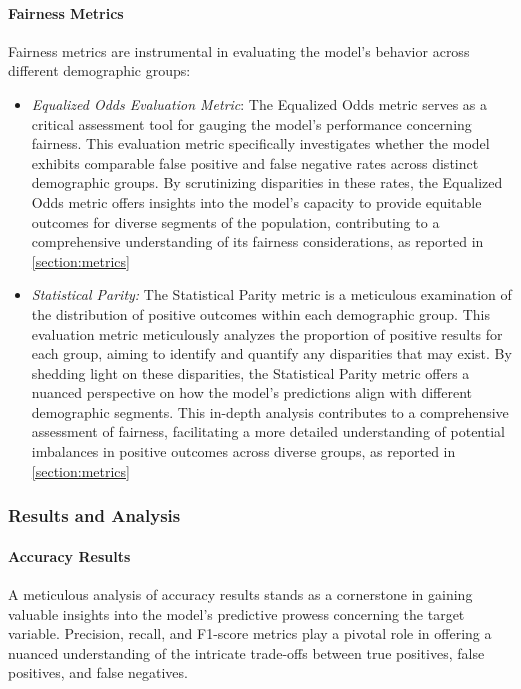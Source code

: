 \paragraph{Fairness Metrics}

Fairness metrics are instrumental in evaluating the model's behavior across different demographic groups:

\begin{itemize}
    
    \item \emph{Equalized Odds Evaluation Metric}: The Equalized Odds metric serves as a critical assessment tool for gauging the model's performance concerning fairness. This evaluation metric specifically investigates whether the model exhibits comparable false positive and false negative rates across distinct demographic groups. By scrutinizing disparities in these rates, the Equalized Odds metric offers insights into the model's capacity to provide equitable outcomes for diverse segments of the population, contributing to a comprehensive understanding of its fairness considerations, as reported in \cref{section:metrics}
    
    \item \emph{Statistical Parity:} The Statistical Parity metric is a meticulous examination of the distribution of positive outcomes within each demographic group. This evaluation metric meticulously analyzes the proportion of positive results for each group, aiming to identify and quantify any disparities that may exist. By shedding light on these disparities, the Statistical Parity metric offers a nuanced perspective on how the model's predictions align with different demographic segments. This in-depth analysis contributes to a comprehensive assessment of fairness, facilitating a more detailed understanding of potential imbalances in positive outcomes across diverse groups, as reported in \cref{section:metrics}

\end{itemize}

\subsubsection{Results and Analysis}

\paragraph{Accuracy Results}

A meticulous analysis of accuracy results stands as a cornerstone in gaining valuable insights into the model's predictive prowess concerning the target variable. Precision, recall, and F1-score metrics play a pivotal role in offering a nuanced understanding of the intricate trade-offs between true positives, false positives, and false negatives.

